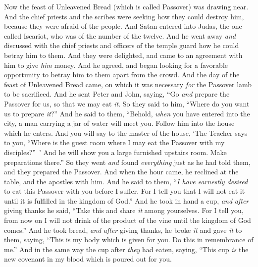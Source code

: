 \begin{biblechapter} %
 Now the feast of Unleavened Bread (which is called Passover) was drawing near.
\verse And the chief priests and the scribes were seeking how they could destroy him, because they were afraid of the people.
 And Satan entered into Judas, the one called Iscariot, who was of the number of the twelve.
\verse And he went away \textit{and} discussed with the chief priests and officers of the temple guard how he could betray him to them.
\verse And they were delighted, and came to an agreement with him to give \textit{him} money.
\verse And he agreed, and began looking for a favorable opportunity to betray him to them apart from the crowd.
 And the day of the feast of Unleavened Bread came, on which it was necessary \textit{for} the Passover lamb to be sacrificed.
\verse And he sent Peter and John, saying, “Go \textit{and} prepare the Passover for us, so that we may eat \textit{it}.
\verse So they said to him, “Where do you want us to prepare \textit{it}?”
\verse And he said to them, “Behold, \textit{when} you have entered into the city, a man carrying a jar of water will meet you. Follow him into the house which he enters.
\verse And you will say to the master of the house, ‘The Teacher says to you, “Where is the guest room where I may eat the Passover with my disciples?” ’
\verse And he will show you a large furnished upstairs room. Make preparations there.”
\verse So they went \textit{and} found \textit{everything} just as he had told them, and they prepared the Passover.
 And when the hour came, he reclined at the table, and the apostles with him.
\verse And he said to them, “\textit{I have earnestly desired} to eat this Passover with you before I suffer.
\verse For I tell you that I will not eat it until it is fulfilled in the kingdom of God.”
\verse And he took in hand a cup, \textit{and} \textit{after} giving thanks he said, “Take this and share \textit{it} among yourselves.
\verse For I tell you, from now on I will not drink of the product of the vine until the kingdom of God comes.”
\verse And he took bread, \textit{and} \textit{after} giving thanks, he broke \textit{it} and gave \textit{it} to them, saying, “This is my body which is given for you. Do this in remembrance of me.”
\verse And in the same way the cup after \textit{they} had eaten, saying, “This cup \textit{is} the new covenant in my blood which is poured out for you.

\end{biblechapter}

